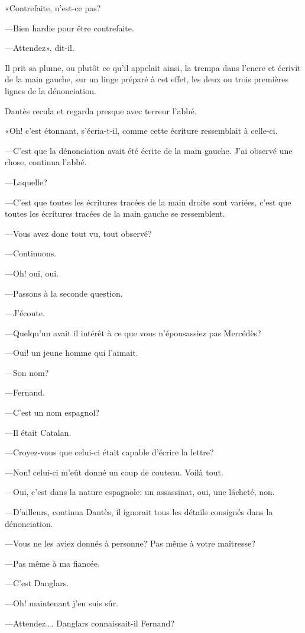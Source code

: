 «Contrefaite, n'est-ce pas?

—Bien hardie pour être contrefaite.

—Attendez», dit-il.

Il prit sa plume, ou plutôt ce qu'il appelait ainsi, la trempa dans l'encre et écrivit de la main gauche, sur un linge préparé à cet effet, les deux ou trois premières lignes de la dénonciation.

Dantès recula et regarda presque avec terreur l'abbé.

«Oh! c'est étonnant, s'écria-t-il, comme cette écriture ressemblait à celle-ci.

—C'est que la dénonciation avait été écrite de la main gauche. J'ai observé une chose, continua l'abbé.

—Laquelle?

—C'est que toutes les écritures tracées de la main droite sont variées, c'est que toutes les écritures tracées de la main gauche se ressemblent.

—Vous avez donc tout vu, tout observé?

—Continuons.

—Oh! oui, oui.

—Passons à la seconde question.

—J'écoute.

—Quelqu'un avait il intérêt à ce que vous n'épousassiez pas Mercédès?

—Oui! un jeune homme qui l'aimait.

—Son nom?

—Fernand.

—C'est un nom espagnol?

—Il était Catalan.

—Croyez-vous que celui-ci était capable d'écrire la lettre?

—Non! celui-ci m'eût donné un coup de couteau. Voilà tout.

—Oui, c'est dans la nature espagnole: un assassinat, oui, une lâcheté, non.

—D'ailleurs, continua Dantès, il ignorait tous les détails consignés dans la dénonciation.

—Vous ne les aviez donnés à personne? Pas même à votre maîtresse?

—Pas même à ma fiancée.

—C'est Danglars.

—Oh! maintenant j'en suis sûr.

—Attendez\dots. Danglars connaissait-il Fernand?


